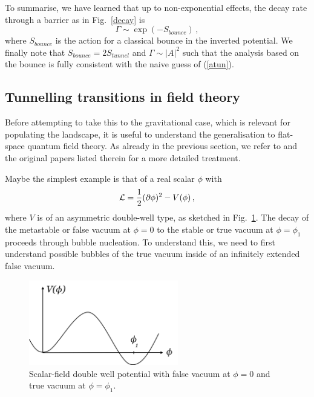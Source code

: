 \documentclass[12pt]{article}
\newcommand{\be}{\begin{equation}}
\newcommand{\ee}{\end{equation}}
\numberwithin{equation}{section}
\begin{document}
To summarise, we have learned that up to non-exponential effects, the decay rate through a barrier as in Fig.~\ref{decay} is
\be
\Gamma \sim \exp(-S_{bounce})\,,
\ee
where $S_{bounce}$ is the action for a classical bounce in the inverted potential. We finally note that $S_{bounce}=2 S_{tunnel}$ and $\Gamma\sim |A|^2$ such that the analysis based on the bounce is fully consistent with the naive guess of (\ref{atun}).






\subsection{Tunnelling transitions in field theory}
\label{tft}
Before attempting to take this to the gravitational case, which is relevant for populating the landscape, it is useful to understand the generalisation to flat-space quantum field theory. As already in the previous section, we refer to \cite{Coleman:1985rnk} and the original papers listed therein for a more detailed treatment.

Maybe the simplest example is that of a real scalar $\phi$ with
\be
{\cal L}=\frac{1}{2}(\partial\phi)^2-V(\phi)\,,\label{lphi}
\ee
where $V$ is of an asymmetric double-well type, as sketched in Fig.~\ref{dwpot}. The decay of the metastable or false vacuum at $\phi=0$ to the stable or true vacuum at $\phi=\phi_1$ proceeds through bubble nucleation. To understand this, we need to first understand possible bubbles of the true vacuum inside of an infinitely extended false vacuum. 

\begin{figure}[ht]
\begin{center} 
\includegraphics[width=6.5cm]{dwpot.png}
\caption{Scalar-field double well potential with false vacuum at $\phi=0$ and true vacuum at $\phi=\phi_1$.}
\label{dwpot} 
\end{center}
\end{figure}
\end{document}
